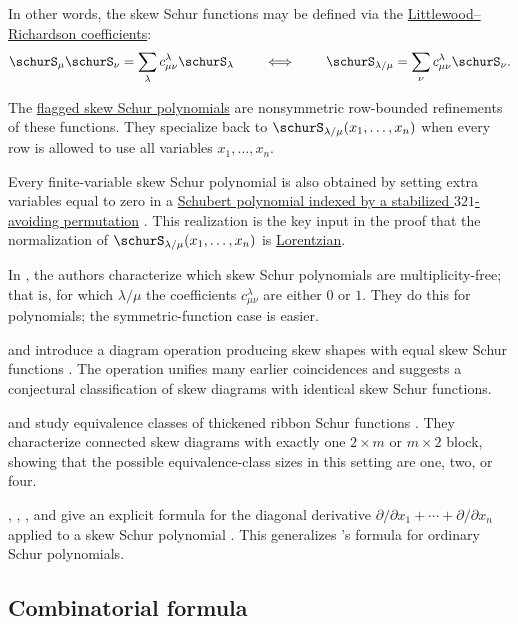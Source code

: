 In other words, the skew Schur functions may be defined via the
\hyperref[schurLittlewoodRichardson]{Littlewood--Richardson coefficients}:
\[
\schurS_\mu  \schurS_\nu = \sum_{\lambda} c^{\lambda}_{\mu \nu} \schurS_\lambda
\qquad \iff \qquad
\schurS_{\lambda/\mu} = \sum_{\nu} c^{\lambda}_{\mu \nu} \schurS_\nu.
\]

The \hyperref[schurFlagged]{flagged skew Schur polynomials} are
nonsymmetric row-bounded refinements of these functions.  They specialize back
to \(\schurS_{\lambda/\mu}(x_1,\dotsc,x_n)\) when every row is allowed to use
all variables \(x_1,\dotsc,x_n\).

Every finite-variable skew Schur polynomial is also obtained by setting extra
variables equal to zero in a
\hyperref[skewSchurFiniteSchubertSpecialization]{Schubert polynomial indexed
by a stabilized \(321\)-avoiding permutation}
\cite{BilleyJockuschStanley1993,Zhang2026x}.  This realization is the key
input in the proof that the normalization of
\(\schurS_{\lambda/\mu}(x_1,\dotsc,x_n)\) is
\hyperref[lorentzianSkewSchur]{Lorentzian}.


In \cite{GaoHodgesOrelowitz2020x}, the authors characterize which skew Schur
polynomials are multiplicity-free; that is, for which $\lambda/\mu$ the
coefficients $c^{\lambda}_{\mu \nu}$ are either $0$ or $1$.  They do this for
polynomials; the symmetric-function case is easier.

 and  introduce a
diagram operation producing skew shapes with equal skew Schur functions
\cite{McNamaraWilligenburg2009}.  The operation unifies many earlier
coincidences and suggests a conjectural classification of skew diagrams with
identical skew Schur functions.

 and  study equivalence classes of
thickened ribbon Schur functions \cite{JinLi2024x}.  They characterize
connected skew diagrams with exactly one $2\times m$ or $m\times 2$ block,
showing that the possible equivalence-class sizes in this setting are one,
two, or four.

, ,
, and  give an explicit
formula for the diagonal derivative
$\partial/\partial x_1+\dotsb+\partial/\partial x_n$ applied to a skew Schur
polynomial \cite{GrinbergKorniichukMolokanovKhomych2024x}.  This generalizes
's formula for ordinary Schur polynomials.


\subsection[skewSchurCombinatorialFormula]{Combinatorial formula}


